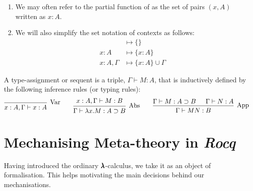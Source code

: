 \begin{notation} \hfill
  \begin{enumerate}
  \item We may often refer to the partial function of as the set of pairs $(x, A)$ written as $x:A$.
  \item We will also simplify the set notation of contexts as follows:
    \begin{align*}
      &\mapsto \{ \} \\
      x:A         &\mapsto \{ x:A \} \\
      x:A, \Gamma &\mapsto \{ x:A \} \cup \Gamma
    \end{align*}
  \end{enumerate}
\end{notation}

\begin{definition}
  A type-assignment or sequent is a triple, $\Gamma \vdash M:A$, that is inductively defined by the following inference rules (or typing rules):
  \[
    \begin{prooftree}
      \infer0[Var]{ x:A, \Gamma \vdash x:A } 
    \end{prooftree}
    \qquad
    \begin{prooftree}
      \hypo{ x:A, \Gamma \vdash M:B }
      \infer1[Abs]{ \Gamma \vdash \lambda x . M : A \supset B  } 
    \end{prooftree}
    \qquad
    \begin{prooftree}
      \hypo{ \Gamma \vdash M : A \supset B }
      \hypo{ \Gamma \vdash N : A }	
      \infer2[App]{ \Gamma \vdash M N : B } 
    \end{prooftree}
  \]
\end{definition}


\section{Mechanising Meta-theory in \textit{Rocq}}

Having introduced the ordinary $\pmb{\lambda}$-calculus, we take it as an object of formalisation.
This helps motivating the main decisions behind our mechanisations.


